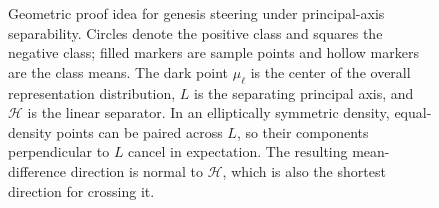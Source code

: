 \begin{figure}[t]
    \caption{Geometric proof idea for genesis steering under principal-axis
    separability. Circles denote the positive class and squares the negative
    class; filled markers are sample points and hollow markers are the class
    means. The dark point $\mu_\ell$ is the center of the overall
    representation distribution, $L$ is the separating principal axis, and
    $\mathcal{H}$ is the linear separator. In an elliptically symmetric
    density, equal-density points can be paired across $L$, so their components
    perpendicular to $L$ cancel in expectation. The resulting mean-difference
    direction is normal to $\mathcal{H}$, which is also the shortest direction
    for crossing it.}
    \label{fig:genesis-geometry}
\end{figure}

